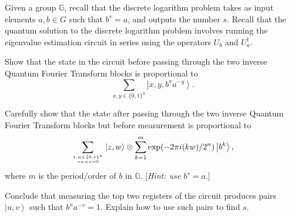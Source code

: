 \documentclass[oneside]{amsart}  %
\newcommand{\m}[1]{\mathbb{#1}}      %
\newcommand{\alg}[1]{\m{#1}}         %
\theoremstyle{plain}
\theoremstyle{definition}
\theoremstyle{remark}
\newcommand{\stack}[2]{\genfrac{}{}{0pt}{}{#1}{#2}}
\numberwithin{equation}{section}  %
\newcommand{\ket}[1]{ \left| #1 \right> }
\begin{document}
\begin{questions}
\newpage \phantom{.} \vspace{-2em}

\item Given a group $\alg{G}$, recall that the discrete logarithm problem takes
as input elements $a, b\in G$ such that $b^s = a$, and outputs the number $s$.
Recall that the quantum solution to the discrete logarithm problem involves
running the eigenvalue estimation circuit in series using the operators $U_b$
and $U_a^{\dagger}$.

\begin{questions}
  \item Show that the state in the circuit before passing through the two
  inverse Quantum Fourier Transform blocks is proportional to
  \[
    \sum_{x,y\in \{0,1\}^n} \ket{x, y, b^x a^{-y}}.
  \]

  \item Carefully show that the state after passing through the two inverse
  Quantum Fourier Transform blocks but before measurement is proportional to
  \[
    \sum_{\stack{z,w\in \{0,1\}^n}{sw+z=0}} \ket{z,w} 
      \otimes \sum_{k=1}^m \exp(-2\pi i (kw)/2^n) \ket{b^k},
  \]
  where $m$ is the period/order of $b$ in $\alg{G}$. [\emph{Hint: use $b^s =
  a$}.]

  \item Conclude that measuring the top two registers of the circuit produces
  pairs $\ket{u, v}$ such that $b^u a^{-v} = 1$. Explain how to use such pairs
  to find $s$.
\end{questions}
\end{questions}
\end{document}
